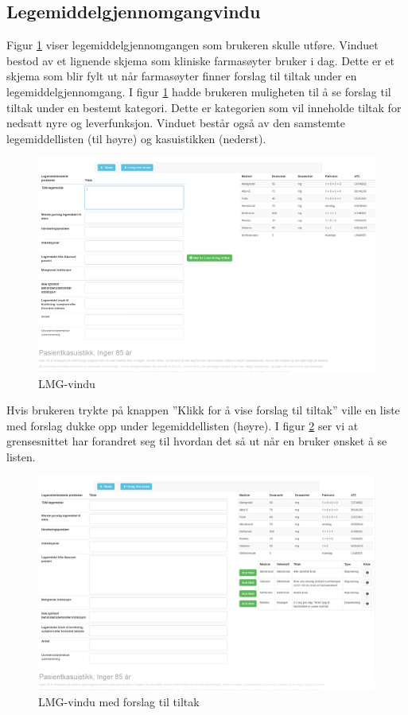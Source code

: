 \subsection{Legemiddelgjennomgangvindu}
Figur \ref{fig:demo4} viser legemiddelgjennomgangen som brukeren skulle utføre. Vinduet bestod av et lignende skjema som kliniske farmasøyter bruker i dag. Dette er et skjema som blir fylt ut når farmasøyter finner forslag til tiltak under en legemiddelgjennomgang. I figur \ref{fig:demo4} hadde brukeren muligheten til å se forslag til tiltak under en bestemt kategori. Dette er kategorien som vil inneholde tiltak for nedsatt nyre og leverfunksjon. Vinduet består også av den samstemte legemiddellisten (til høyre) og kasuistikken (nederst).
\begin{figure}[H]
\begin{center}
\includegraphics[width=18cm]{images/demoimages/4}
\caption{LMG-vindu}
\label{fig:demo4}
\end{center}
\end{figure}
\newpage
 Hvis brukeren trykte på knappen ''Klikk for å vise forslag til tiltak'' ville en liste med forslag dukke opp under legemiddellisten (høyre). I figur \ref{fig:demo5} ser vi at grensesnittet har forandret seg til hvordan det så ut når en bruker ønsket å se listen.
\begin{figure}[H]
\begin{center}
\includegraphics[width=18cm]{images/demoimages/5}
\caption{LMG-vindu med forslag til tiltak}
\label{fig:demo5}
\end{center}
\end{figure}
